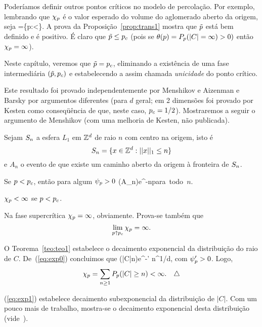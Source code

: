 Poderíamos definir outros pontos críticos no modelo de percolação. Por exemplo,  
lembrando que $\chi_p$ é o valor esperado do volume do aglomerado aberto da origem, 
seja 
\beq 
\pt=\sup\{p:\xip<\infty\}. 
\eeq 
A prova da Proposição~\ref{prop:trans1} mostra que $\tilde{p}$ está bem definido e é
positivo.
É claro que $\tilde{p}\leq p_c$ (pois se $\theta(p)=P_p(|C|=\infty)>0)$ então $\chi_p=\infty$). 
 
Neste capítulo,  veremos que $\tilde{p}=p_c$, eliminando a existência de uma fase 
intermediária $(\tilde{p},p_c)$ e estabelecendo a assim chamada {\em unicidade} do ponto 
crítico. 
 
Este resultado foi provado independentemente por Menshikov \cite{kn:M} e  
Aizenman e Barsky \cite{kn:AB} por argumentos diferentes (para $d$ geral; em 2 dimensões foi provado 
por Kesten \cite{kn:K1} como conseqüência de que, neste caso, $p_c=1/2$). Mostraremos a seguir o 
argumento de Menshikov (com uma melhoria de Kesten, não publicada). 
 
Sejam $S_n$ a esfera $L_1$  em $\mathbb{Z}^d$ de raio $n$ com centro na origem, isto é 
$$S_n=\{x\in\mathbb{Z}^d:||x||_1\leq n\}$$ e  $A_n$ o evento de que existe um caminho 
aberto da origem à fronteira de $S_n$. 

\vs

\bte[Menshikov]
\label{teo:teo1} 
Se $p<p_c$, então para algum $\psi_p>0$ 
\beq 
\label{eq:exp0}
\p(A_n)\leq e^{-\psp n}\quad\mbox{para todo $n$.} 
\eeq  
\ete 

 
\vs

\bco
\label{cor:exp}
$\chi_p<\infty$ se $p<p_c$.
\eco

\vs

\bob
Na fase supercrítica $\chi_p=\infty$, obviamente.
Prova-se tam\-bém \cite{kn:G} que $$\lim_{p\uparrow p_c}\chi_p=\infty.$$
\eob

\vs


O Teorema~\ref{teo:teo1} estabelece o decaimento exponencial da distribuição
do raio de $C$.
De~(\ref{eq:exp0}) concluimos que 
\beq
\label{eq:exp1}
\p(|C|\geq n)\leq e^{-\psp' n^{1/d}},
\eeq
com $\psi_p'>0$. Logo,
$$\chi_p=\sum_{n\geq1}P_p(|C|\geq n)<\infty. \quad\triangle$$

\vs

\bob
\label{ob:exp1}
(\ref{eq:exp1}) estabelece decaimento subexponencial da distribuição de 
$|C|$. Com um pouco mais de trabalho, mostra-se o decaimento exponencial desta
distribuição (vide~\cite{kn:G}).
\eob

